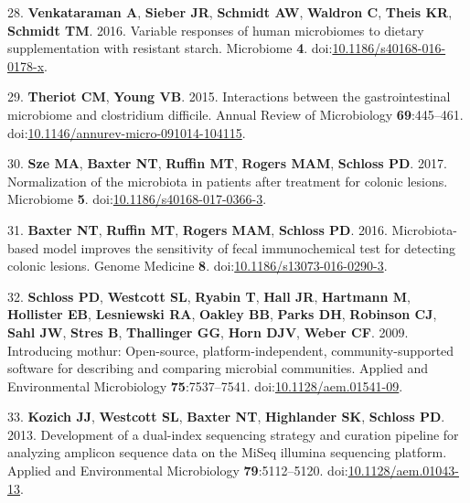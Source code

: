 \documentclass[11pt,]{article}
\begin{document}
\hypertarget{ref-scfa_measures_venkataraman2016}{}
28. \textbf{Venkataraman A}, \textbf{Sieber JR}, \textbf{Schmidt AW},
\textbf{Waldron C}, \textbf{Theis KR}, \textbf{Schmidt TM}. 2016.
Variable responses of human microbiomes to dietary supplementation with
resistant starch. Microbiome \textbf{4}.
doi:\href{https://doi.org/10.1186/s40168-016-0178-x}{10.1186/s40168-016-0178-x}.

\hypertarget{ref-Theriot2015}{}
29. \textbf{Theriot CM}, \textbf{Young VB}. 2015. Interactions between
the gastrointestinal microbiome and clostridium difficile. Annual Review
of Microbiology \textbf{69}:445--461.
doi:\href{https://doi.org/10.1146/annurev-micro-091014-104115}{10.1146/annurev-micro-091014-104115}.

\hypertarget{ref-normalization_sze2017}{}
30. \textbf{Sze MA}, \textbf{Baxter NT}, \textbf{Ruffin MT},
\textbf{Rogers MAM}, \textbf{Schloss PD}. 2017. Normalization of the
microbiota in patients after treatment for colonic lesions. Microbiome
\textbf{5}.
doi:\href{https://doi.org/10.1186/s40168-017-0366-3}{10.1186/s40168-017-0366-3}.

\hypertarget{ref-crc_model_baxter2016}{}
31. \textbf{Baxter NT}, \textbf{Ruffin MT}, \textbf{Rogers MAM},
\textbf{Schloss PD}. 2016. Microbiota-based model improves the
sensitivity of fecal immunochemical test for detecting colonic lesions.
Genome Medicine \textbf{8}.
doi:\href{https://doi.org/10.1186/s13073-016-0290-3}{10.1186/s13073-016-0290-3}.

\hypertarget{ref-Schloss2009}{}
32. \textbf{Schloss PD}, \textbf{Westcott SL}, \textbf{Ryabin T},
\textbf{Hall JR}, \textbf{Hartmann M}, \textbf{Hollister EB},
\textbf{Lesniewski RA}, \textbf{Oakley BB}, \textbf{Parks DH},
\textbf{Robinson CJ}, \textbf{Sahl JW}, \textbf{Stres B},
\textbf{Thallinger GG}, \textbf{Horn DJV}, \textbf{Weber CF}. 2009.
Introducing mothur: Open-source, platform-independent,
community-supported software for describing and comparing microbial
communities. Applied and Environmental Microbiology
\textbf{75}:7537--7541.
doi:\href{https://doi.org/10.1128/aem.01541-09}{10.1128/aem.01541-09}.

\hypertarget{ref-Kozich2013}{}
33. \textbf{Kozich JJ}, \textbf{Westcott SL}, \textbf{Baxter NT},
\textbf{Highlander SK}, \textbf{Schloss PD}. 2013. Development of a
dual-index sequencing strategy and curation pipeline for analyzing
amplicon sequence data on the MiSeq illumina sequencing platform.
Applied and Environmental Microbiology \textbf{79}:5112--5120.
doi:\href{https://doi.org/10.1128/aem.01043-13}{10.1128/aem.01043-13}.
\end{document}
